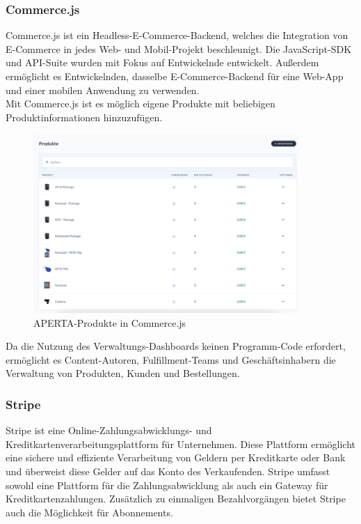 \newpage

\subsubsection{Commerce.js}

Commerce.js ist ein Headless-E-Commerce-Backend, welches die Integration von E-Commerce in jedes Web- und Mobil-Projekt beschleunigt. Die JavaScript-SDK und API-Suite wurden mit Fokus auf Entwickelnde entwickelt. Außerdem ermöglicht es Entwickelnden, dasselbe E-Commerce-Backend für eine Web-App und einer mobilen Anwendung zu verwenden.
\cite{commerceJS}\\

Mit Commerce.js ist es möglich eigene Produkte mit beliebigen Produktinformationen hinzuzufügen.

\begin{figure}[H]
  \centering
  \includegraphics[width=0.9\textwidth]{pics/apertaProdukteCommerce.png}
  \caption{APERTA-Produkte in Commerce.js}
\end{figure}

Da die Nutzung des Verwaltungs-Dashboards keinen Programm-Code erfordert, ermöglicht es Content-Autoren, Fulfillment-Teams und Geschäftsinhabern die Verwaltung von Produkten, Kunden und Bestellungen.
\cite{commerceJS}

\newpage

\subsubsection{Stripe}

Stripe ist eine Online-Zahlungsabwicklungs- und Kreditkartenverarbeitungsplattform für Unternehmen. Diese Plattform ermöglicht eine sichere und effiziente Verarbeitung von Geldern per Kreditkarte oder Bank und überweist diese Gelder auf das Konto des Verkaufenden. Stripe umfasst sowohl eine Plattform für die Zahlungsabwicklung als auch ein Gateway für Kreditkartenzahlungen. Zusätzlich zu einmaligen Bezahlvorgängen bietet Stripe auch die Möglichkeit für Abonnements.

